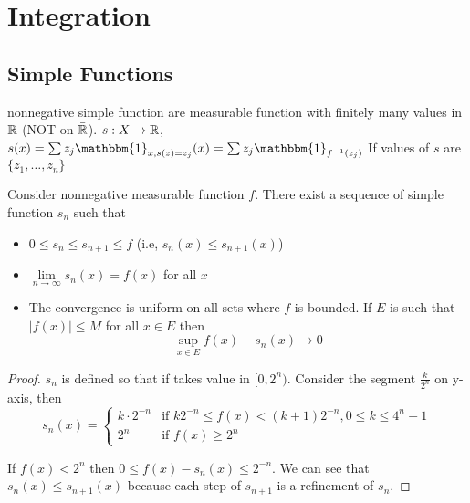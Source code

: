 
\chapter{Integration}
\section{Simple Functions}

\begin{definition}
  nonnegative simple function are measurable function with finitely many values in $\mathbb R$ (NOT on $\bar{\mathbb R}$).
  $s: X \to \mathbb R$, $s(x) = \sum z_j \mathbbm{1}_{x, s(z) = z_j}(x) = \sum z_j \mathbbm{1}_{f^{-1}({z_j})}$
  If values of $s$ are $\{z_1, \dotsc, z_n\}$
\end{definition}


\begin{theorem}
  Consider nonnegative measurable function $f$.
  There exist a sequence of simple function $s_n$ such that 
  \begin{itemize}
    \item $0 \le s_n \le s_{n+1} \le f$ (i.e, $s_n(x) \le s_{n+1}(x)$)
    \item $\lim\limits_{n\to\infty}s_n(x) = f(x)$ for all $x$
    \item The convergence is uniform on all sets where $f$ is bounded.
    If $E$ is such that $|f(x)| \le M$ for all $x \in E$ then
    \[\sup_{x \in E} f(x) - s_n(x) \to 0\]
  \end{itemize}
\end{theorem}

\begin{proof}
  $s_n$ is defined so that if takes value in $[0, 2^n)$. Consider the segment $\frac{k}{2^n}$ on y-axis,
  then $$s_n(x) = \begin{cases}
    k\cdot2^{-n} & \text{if } k2^{-n} \le f(x) < (k+1)2^{-n}, 0 \le k \le 4^n - 1 \\
    2^n & \text{if } f(x) \ge 2^n
  \end{cases}$$

If $f(x) < 2^n$ then $0 \le f(x) - s_n(x) \le 2^{-n}$. We can see that $s_n(x) \le s_{n+1}(x)$ because
each step of $s_{n+1}$ is a refinement of $s_n$.
\end{proof}

